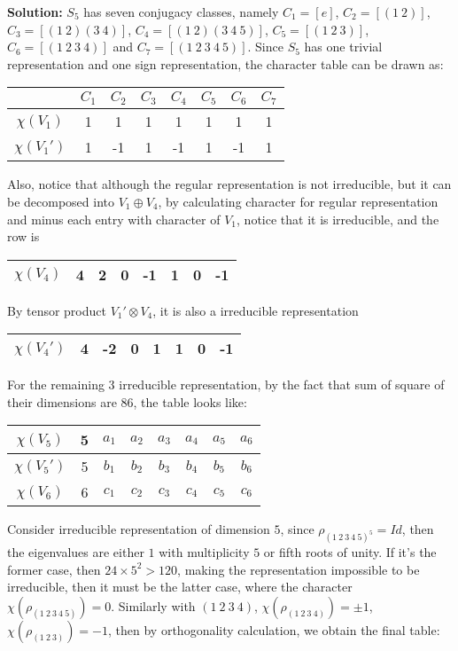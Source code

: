 \documentclass[12pt]{article}
\begin{document}
\textbf{Solution:} $S_5$ has seven conjugacy classes, namely $C_1=[e]$, $C_2=[(1\ 2)]$, $C_3=[(1\ 2)(3\ 4)]$, $C_4=[(1\ 2)(3\ 4\ 5)]$, $C_5=[(1\ 2\ 3)]$, $C_6=[(1\ 2\ 3\ 4)]$ and $C_7=[(1\ 2\ 3\ 4\ 5)]$. Since $S_5$ has one trivial representation and one sign representation, the character table can be drawn as: 
\begin{center}
\begin{tabular}{||c c c c c c c c||}
\hline
 & $C_1$ & $C_2$ & $C_3$ & $C_4$ & $C_5$ & $C_6$ & $C_7$\\
\hline
$\chi(V_1)$ & 1 & 1 & 1 & 1 & 1 & 1 & 1 \\ 
\hline
$\chi(V_1')$ & 1 & -1 & 1 & -1 & 1 & -1 & 1 \\
\hline
\end{tabular}
\end{center}
Also, notice that although the regular representation is not irreducible, but it can be decomposed into $V_1\oplus V_4$, by calculating character for regular representation and minus each entry with character of $V_1$, notice that it is irreducible, and the row is 
\begin{center}
\begin{tabular}{||c c c c c c c c||}
\hline
$\chi(V_4)$ & 4 & 2 & 0 & -1 & 1 & 0 & -1 \\
\hline
\end{tabular}
\end{center}
By tensor product $V_1'\otimes V_4$, it is also a irreducible
representation 
\begin{center}
\begin{tabular}{||c c c c c c c c||}
\hline
$\chi(V_4')$ & 4 & -2 & 0 & 1 & 1 & 0 & -1 \\
\hline
\end{tabular}
\end{center}
For the remaining 3 irreducible representation, by the fact that sum of square of their dimensions are $86$, the table looks like: 
\begin{center}
\begin{tabular}{||c c c c c c c c||}
\hline
$\chi(V_5)$ & 5 & $a_1$ & $a_2$ & $a_3$ & $a_4$ & $a_5$ & $a_6$ \\
\hline
$\chi(V_5')$ & 5 & $b_1$ & $b_2$ & $b_3$ & $b_4$ & $b_5$ & $b_6$ \\
\hline
$\chi(V_6)$ & 6 & $c_1$ & $c_2$ & $c_3$ & $c_4$ & $c_5$ & $c_6$ \\
\hline
\end{tabular}
\end{center}
Consider irreducible representation of dimension $5$, since $\rho_{(1\ 2\ 3\ 4\ 5)^5}=Id$, then the eigenvalues are either $1$ with multiplicity $5$ or fifth roots of unity. If it's the former case, then $24\times 5^2> 120$, making the representation impossible to be irreducible, then it must be the latter case, where the character $\chi(\rho_{(1\ 2\ 3\ 4\ 5)})=0$. Similarly with $(1\ 2\ 3\ 4)$, $\chi(\rho_{(1\ 2\ 3\ 4)})=\pm1$, $\chi(\rho_{(1\ 2\ 3)})=-1$, then by orthogonality calculation, we obtain the final table:
\end{document}
